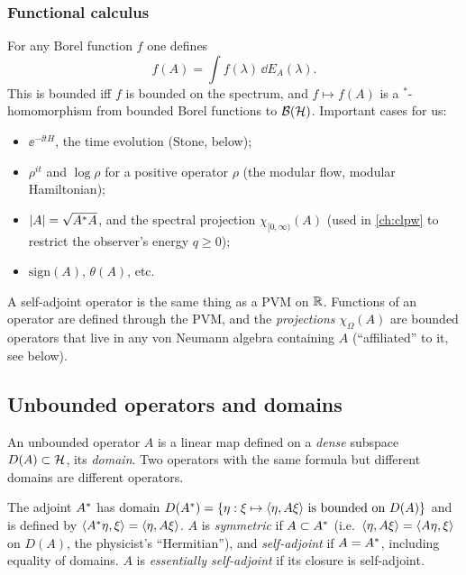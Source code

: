 \subsubsection*{Functional calculus}
For any Borel function $f$ one defines
\begin{equation}
f(A)=\int f(\lambda)\,\dd E_A(\lambda).
\end{equation}
This is bounded iff $f$ is bounded on the spectrum, and $f\mapsto f(A)$ is a $^*$-homomorphism from bounded Borel functions to $\mathcal{B}(\mathcal{H})$. Important cases for us:
\begin{itemize}
\item $\ee^{-\ii tH}$, the time evolution (Stone, below);
\item $\rho^{it}$ and $\log\rho$ for a positive operator $\rho$ (the modular flow, modular Hamiltonian);
\item $|A|=\sqrt{A^{*} A}$, and the spectral projection $\chi_{[0,\infty)}(A)$ (used in \cref{ch:clpw} to restrict the observer's energy $q\ge0$);
\item $\mathrm{sign}(A)$, $\theta(A)$, etc.
\end{itemize}

\begin{keyidea}
A self-adjoint operator is the same thing as a PVM on $\mathbb{R}$. Functions of an operator are defined through the PVM, and the \emph{projections} $\chi_\Omega(A)$ are bounded operators that live in any von Neumann algebra containing $A$ (``affiliated'' to it, see below).
\end{keyidea}

\subsection{Unbounded operators and domains}

An unbounded operator $A$ is a linear map defined on a \emph{dense} subspace $D(A)\subset\mathcal{H}$, its \emph{domain}. Two operators with the same formula but different domains are different operators.

\begin{definition}
The adjoint $A^{*}$ has domain $D(A^{*})=\{\eta:\xi\mapsto\langle \eta,A\xi\rangle\text{ is bounded on }D(A)\}$ and is defined by $\langle A^{*}\eta,\xi\rangle=\langle \eta,A\xi\rangle$. $A$ is \emph{symmetric} if $A\subset A^{*}$ (i.e.\ $\langle \eta,A\xi\rangle=\langle A\eta,\xi\rangle$ on $D(A)$, the physicist's ``Hermitian''), and \emph{self-adjoint} if $A=A^{*}$, including equality of domains. $A$ is \emph{essentially self-adjoint} if its closure is self-adjoint.
\end{definition}

